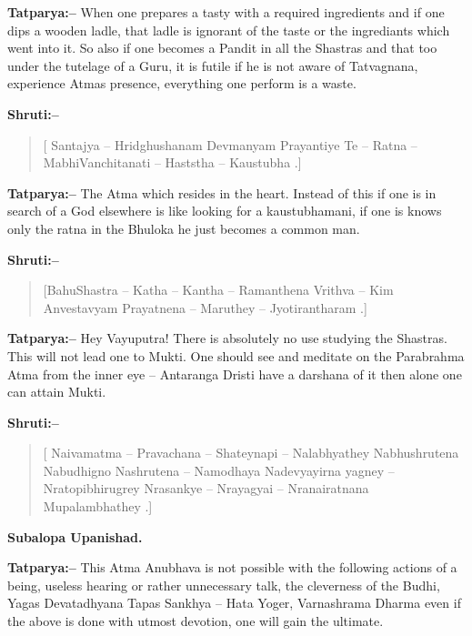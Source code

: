 \textbf{Tatparya:–} When one prepares a tasty with a required ingredients and if one dips a wooden ladle, that ladle is ignorant of the taste or the ingrediants which went into it. So also if one becomes a Pandit in all the Shastras and that too under the tutelage of a Guru, it is futile if he is not aware of Tatvagnana, experience Atmas presence, everything one perform is a waste.

\textbf{Shruti:–}

\begin{verse}
[ Santajya – Hridghushanam Devmanyam Prayantiye  Te – Ratna – MabhiVanchitanati – Haststha – Kaustubha .]
\end{verse}

\textbf{Tatparya:–} The Atma which resides in the heart. Instead of this if one is in search of a God elsewhere is like looking for a kaustubhamani, if one is knows only the ratna in the Bhuloka he just becomes a common man.

\textbf{Shruti:–}

\begin{verse}
[BahuShastra – Katha – Kantha – Ramanthena Vrithva – Kim  Anvestavyam Prayatnena – Maruthey – Jyotirantharam .]
\end{verse}

\textbf{Tatparya:–} Hey Vayuputra! There is absolutely no use studying the Shastras. This will not lead one to Mukti. One should see and meditate on the Parabrahma Atma from the inner eye – Antaranga Dristi have a darshana of it then alone one can attain Mukti.

\textbf{Shruti:–}

\begin{verse}
[ Naivamatma – Pravachana – Shateynapi – Nalabhyathey Nabhushrutena Nabudhigno Nashrutena – Namodhaya Nadevyayirna yagney – Nratopibhirugrey Nrasankye – Nrayagyai – Nranairatnana Mupalambhathey .]
\end{verse}

\begin{flushright}
\textbf{Subalopa Upanishad.}
\end{flushright}

\textbf{Tatparya:–} This Atma Anubhava is not possible with the following actions of a being, useless hearing or rather unnecessary talk, the cleverness of the Budhi, Yagas Devatadhyana Tapas Sankhya – Hata Yoger, Varnashrama Dharma even if the above is done with utmost devotion, one will gain the ultimate.

